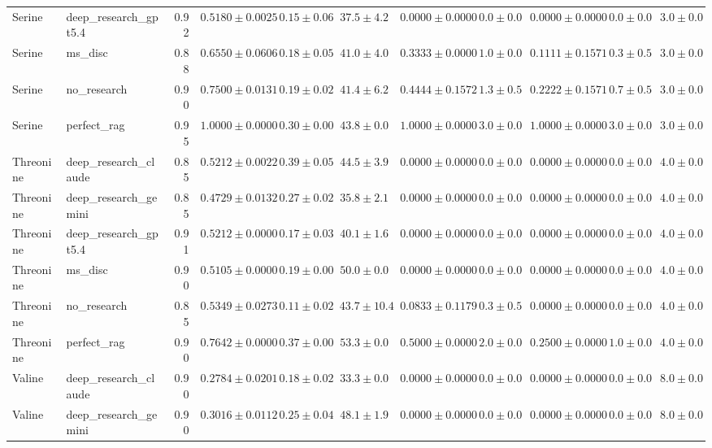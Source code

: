 \begin{table}[htbp]
\begin{tabular}{llrrrrrrrrr}
Serine & deep_research_gpt5.4 & 0.92 & \cellcolor{red!25}$0.5180 \pm 0.0025$ & $0.15 \pm 0.06$ & $37.5 \pm 4.2$ & $0.0000 \pm 0.0000$ & $0.0 \pm 0.0$ & $0.0000 \pm 0.0000$ & $0.0 \pm 0.0$ & $3.0 \pm 0.0$ \\
Serine & ms_disc & 0.88 & $0.6550 \pm 0.0606$ & $0.18 \pm 0.05$ & $41.0 \pm 4.0$ & $0.3333 \pm 0.0000$ & $1.0 \pm 0.0$ & $0.1111 \pm 0.1571$ & $0.3 \pm 0.5$ & $3.0 \pm 0.0$ \\
Serine & no_research & 0.90 & $0.7500 \pm 0.0131$ & $0.19 \pm 0.02$ & $41.4 \pm 6.2$ & $0.4444 \pm 0.1572$ & $1.3 \pm 0.5$ & $0.2222 \pm 0.1571$ & $0.7 \pm 0.5$ & $3.0 \pm 0.0$ \\
Serine & perfect_rag & 0.95 & \cellcolor{green!25}$1.0000 \pm 0.0000$ & $0.30 \pm 0.00$ & $43.8 \pm 0.0$ & $1.0000 \pm 0.0000$ & $3.0 \pm 0.0$ & $1.0000 \pm 0.0000$ & $3.0 \pm 0.0$ & $3.0 \pm 0.0$ \\
\midrule
Threonine & deep_research_claude & 0.85 & $0.5212 \pm 0.0022$ & $0.39 \pm 0.05$ & $44.5 \pm 3.9$ & $0.0000 \pm 0.0000$ & $0.0 \pm 0.0$ & $0.0000 \pm 0.0000$ & $0.0 \pm 0.0$ & $4.0 \pm 0.0$ \\
Threonine & deep_research_gemini & 0.85 & \cellcolor{red!25}$0.4729 \pm 0.0132$ & $0.27 \pm 0.02$ & $35.8 \pm 2.1$ & $0.0000 \pm 0.0000$ & $0.0 \pm 0.0$ & $0.0000 \pm 0.0000$ & $0.0 \pm 0.0$ & $4.0 \pm 0.0$ \\
Threonine & deep_research_gpt5.4 & 0.91 & $0.5212 \pm 0.0000$ & $0.17 \pm 0.03$ & $40.1 \pm 1.6$ & $0.0000 \pm 0.0000$ & $0.0 \pm 0.0$ & $0.0000 \pm 0.0000$ & $0.0 \pm 0.0$ & $4.0 \pm 0.0$ \\
Threonine & ms_disc & 0.90 & $0.5105 \pm 0.0000$ & $0.19 \pm 0.00$ & $50.0 \pm 0.0$ & $0.0000 \pm 0.0000$ & $0.0 \pm 0.0$ & $0.0000 \pm 0.0000$ & $0.0 \pm 0.0$ & $4.0 \pm 0.0$ \\
Threonine & no_research & 0.85 & $0.5349 \pm 0.0273$ & $0.11 \pm 0.02$ & $43.7 \pm 10.4$ & $0.0833 \pm 0.1179$ & $0.3 \pm 0.5$ & $0.0000 \pm 0.0000$ & $0.0 \pm 0.0$ & $4.0 \pm 0.0$ \\
Threonine & perfect_rag & 0.90 & \cellcolor{green!25}$0.7642 \pm 0.0000$ & $0.37 \pm 0.00$ & $53.3 \pm 0.0$ & $0.5000 \pm 0.0000$ & $2.0 \pm 0.0$ & $0.2500 \pm 0.0000$ & $1.0 \pm 0.0$ & $4.0 \pm 0.0$ \\
\midrule
Valine & deep_research_claude & 0.90 & $0.2784 \pm 0.0201$ & $0.18 \pm 0.02$ & $33.3 \pm 0.0$ & $0.0000 \pm 0.0000$ & $0.0 \pm 0.0$ & $0.0000 \pm 0.0000$ & $0.0 \pm 0.0$ & $8.0 \pm 0.0$ \\
Valine & deep_research_gemini & 0.90 & $0.3016 \pm 0.0112$ & $0.25 \pm 0.04$ & $48.1 \pm 1.9$ & $0.0000 \pm 0.0000$ & $0.0 \pm 0.0$ & $0.0000 \pm 0.0000$ & $0.0 \pm 0.0$ & $8.0 \pm 0.0$ \\

\end{tabular}
\end{table}
